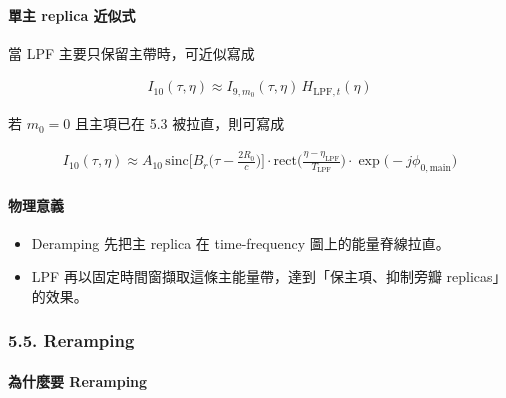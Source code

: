 \documentclass[11pt]{article}
\providecommand{\tightlist}{%
  \setlength{\itemsep}{0pt}\setlength{\parskip}{0pt}}
\begin{document}
\hypertarget{ux55aeux4e3b-replica-ux8fd1ux4f3cux5f0f}{%
\paragraph{單主 replica
近似式}\label{ux55aeux4e3b-replica-ux8fd1ux4f3cux5f0f}}

當 LPF 主要只保留主帶時，可近似寫成

\begin{equation}
\begin{aligned}
I_{10}(\tau,\eta)\approx I_{9,m_0}(\tau,\eta)\,H_{\mathrm{LPF},t}(\eta)
\end{aligned}
\end{equation}

若 \(m_0=0\) 且主項已在 5.3 被拉直，則可寫成

\begin{equation}
\begin{aligned}
I_{10}(\tau,\eta)\approx A_{10}\,
\mathrm{sinc}\biggl[ B_r\biggl( \tau-\frac{2R_0}{c} \biggr) \biggr]\cdot
\mathrm{rect}\biggl( \frac{\eta-\eta_{\mathrm{LPF}}}{T_{\mathrm{LPF}}} \biggr)\cdot
\exp\biggl( -j\phi_{0,\mathrm{main}} \biggr)
\end{aligned}
\end{equation}

\hypertarget{ux7269ux7406ux610fux7fa9}{%
\paragraph{物理意義}\label{ux7269ux7406ux610fux7fa9}}

\begin{itemize}
\tightlist
\item
  Deramping 先把主 replica 在 time-frequency 圖上的能量脊線拉直。
\item
  LPF 再以固定時間窗擷取這條主能量帶，達到「保主項、抑制旁瓣
  replicas」的效果。
\end{itemize}

\hypertarget{reramping-1}{%
\subsubsection{5.5. Reramping}\label{reramping-1}}

\hypertarget{ux70baux4ec0ux9ebcux8981-reramping-1}{%
\paragraph{為什麼要
Reramping}\label{ux70baux4ec0ux9ebcux8981-reramping-1}}
\end{document}
